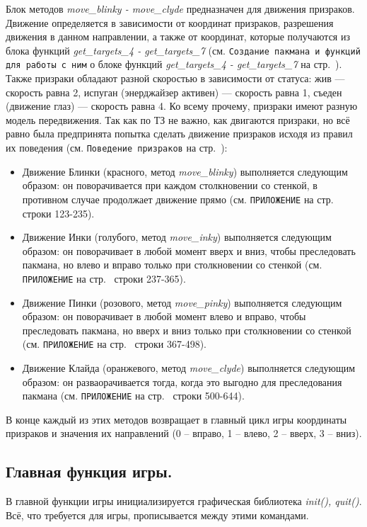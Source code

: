 Блок методов \textit{move\_blinky - move\_clyde} предназначен для движения призраков. Движение определяется в зависимости от координат призраков, разрешения движения в данном направлении, а также от координат, которые получаются из блока функций \textit{get\_targets\_4 - get\_targets\_7} (см. \texttt{Создание пакмана и функций для работы с ним} о блоке функций \textit{get\_targets\_4 - get\_targets\_7} на стр.~\pageref{subsec:ch02/sec01/sub05}). Также призраки обладают разной скоростью в зависимости от статуса: жив --- скорость равна 2, испуган (энерджайзер активен) --- скорость равна 1, съеден (движение глаз) --- скорость равна 4. Ко всему прочему, призраки имеют разную модель передвижения. Так как по ТЗ не важно, как двигаются призраки, но всё равно была предпринята попытка сделать движение призраков исходя из правил их поведения (см. \texttt{Поведение призраков} на стр.~\pageref{subsec:ch01/sec04/subsec03}):
\begin{itemize}
	\item Движение Блинки (красного, метод \textit{move\_blinky}) выполняется следующим образом: он поворачивается при каждом столкновении со стенкой, в противном случае
	продолжает движение прямо (см. \texttt{ПРИЛОЖЕНИЕ} на стр.~\pageref{code:ghost} строки 123-235).
	\item Движение Инки (голубого, метод \textit{move\_inky}) выполняется следующим образом: он поворачивает в любой момент вверх и вниз, чтобы преследовать пакмана, но влево и вправо только при столкновении со стенкой (см. \texttt{ПРИЛОЖЕНИЕ} на стр.~\pageref{code:ghost} строки 237-365).
	\item Движение Пинки (розового, метод \textit{move\_pinky}) выполняется следующим образом: он поворачивает в любой момент влево и вправо, чтобы преследовать пакмана, но вверх и вниз только при столкновении со стенкой (см. \texttt{ПРИЛОЖЕНИЕ} на стр.~\pageref{code:ghost} строки 367-498).
	\item Движение Клайда (оранжевого, метод \textit{move\_clyde}) выполняется следующим образом: он разваорачивается тогда, когда это выгодно для преследования пакмана (см. \texttt{ПРИЛОЖЕНИЕ} на стр.~\pageref{code:ghost} строки 500-644).
\end{itemize}

В конце каждый из этих методов возвращает в главный цикл игры координаты призраков и значения их направлений (0 -- вправо, 1 -- влево, 2 -- вверх, 3 -- вниз).

\subsection{\label{subsec:ch02/sec01/sub07}Главная функция игры.}
В главной функции игры инициализируется графическая библиотека \textit{init(), quit()}. Всё, что требуется для игры, прописывается между этими командами.

